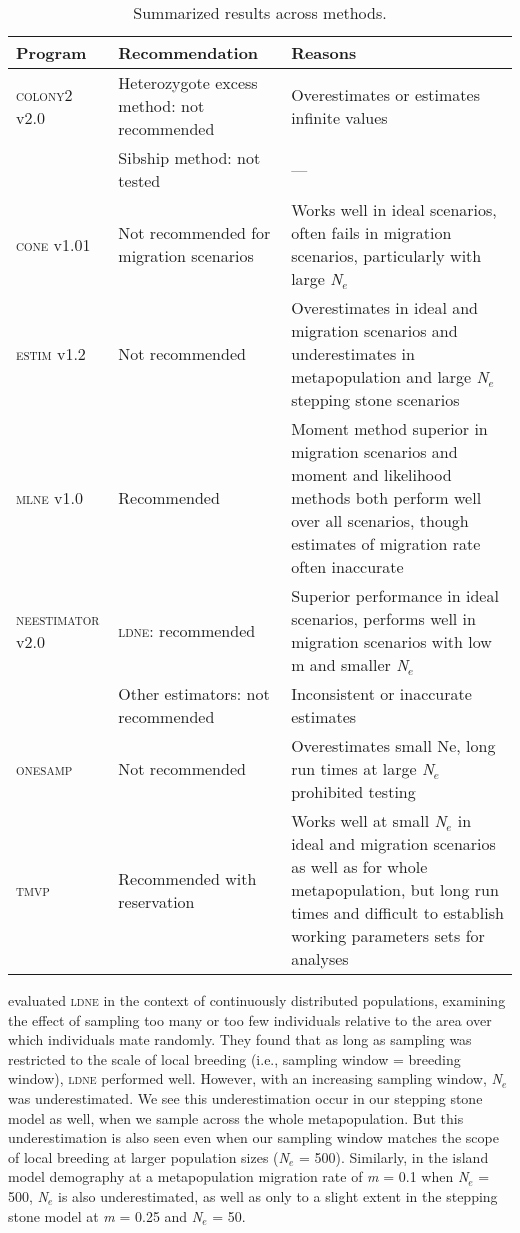 \begin{table}[]
\centering
\begin{tabular}{p{}|p{}|p{}}
Program 				& Recommendation 				& Reasons \\ \hline
\textsc{colony2} v2.0 	&	Heterozygote excess method: not recommended	& Overestimates or estimates infinite values \\
						& 	Sibship method: not tested	& --- \\
\textsc{cone} v1.01 	&	Not recommended for migration scenarios	& \small{Works well in ideal scenarios, often fails in migration scenarios, particularly with large \emph{N}$_e$} \\
\textsc{estim} v1.2 	&	Not recommended	& \small{Overestimates in ideal and migration scenarios and underestimates in metapopulation and large \emph{N}$_e$ stepping stone scenarios} \\
\textsc{mlne} v1.0 		&	Recommended	& \small{Moment method superior in migration scenarios and moment and likelihood methods both perform well over all scenarios, though estimates of migration rate often inaccurate} \\ 
\textsc{neestimator} v2.0 	&	\textsc{ldne}: recommended	& \small{Superior performance in ideal scenarios, performs well in migration scenarios with low m and smaller \emph{N}$_e$} \\ 
						& 	Other estimators: not recommended	& Inconsistent or inaccurate estimates \\
\textsc{onesamp} 		&	Not recommended	& Overestimates small Ne, long run times at large \emph{N}$_e$ prohibited testing \\ 
\textsc{tmvp}			&	Recommended with reservation	&	\small{Works well at small \emph{N}$_e$ in ideal and migration scenarios as well as for whole metapopulation, but long run times and difficult to establish working parameters sets for analyses} \\
\end{tabular}
\label{tab:Ne-4}
\caption{Summarized results across methods.}
\end{table}

\citet{Neel:2013} evaluated \textsc{ldne} in the context of continuously distributed populations, 
examining the effect of sampling too many or too few individuals relative to the area over which 
individuals mate randomly. They found that as long as sampling was restricted to the scale of local 
breeding (i.e., sampling window = breeding window), \textsc{ldne} performed well. However, with an 
increasing sampling window, \emph{N}$_e$ was underestimated. We see this underestimation occur in 
our stepping stone model as well, when we sample across the whole metapopulation. But this 
underestimation is also seen even when our sampling window matches the scope of local breeding 
at larger population sizes (\emph{N}$_e$ = 500). Similarly, in the island model demography at 
a metapopulation migration rate of \emph{m} = 0.1 when \emph{N}$_e$ = 500, \emph{N}$_e$ is also 
underestimated, as well as only to a slight extent in the stepping stone model at \emph{m} = 0.25 and \emph{N}$_e$ = 50.

